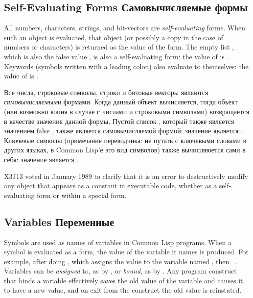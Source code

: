 \subsection{Self-Evaluating Forms Самовычисляемые формы}

All numbers, characters, strings, and bit-vectors
are \textit{self-evaluating} forms.
When such an object is evaluated, that object
(or possibly a copy in the case of numbers or characters)
is returned as the value
of the form.  The empty list {\emptylist}, which is also the false value {\false},
is also a self-evaluating form: the value of {\false} is {\false}.
Keywords (symbols written with a leading colon) also evaluate
to themselves: the value of  is .

Все числа, строковые символы, строки и битовые векторы являются
\textit{самовычисляемыми} формами.
Когда данный объект вычисляется, тогда объект (или возможно копия в случае с
числами и строковыми символами) возвращается в качестве значения данной
формы. Пустой список {\emptylist}, который также является значением false
{\false}, также является самовычисляемой формой: значение {\false} является
{\false}. 
Ключевые символы (примечание переводчика: не путать с ключевыми словами в других
языках, в Common Lisp'е это вид символов) также вычисляюется сами в себя:
значение  является .

\begin{newer}
X3J13 voted in January 1989  to clarify that
it is an error to destructively modify any object that appears as a constant
in executable code, whether as
a self-evaluating form or within a  special form.
\end{newer}

\subsection{Variables Переменные}

Symbols are used as names of variables in Common Lisp programs.
When a symbol is evaluated as a form, the value of the variable it names
is produced.  For example, after doing , which assigns
the value  to the variable named , then  \EV\ .
Variables can be \textit{assigned} to, as by , or \textit{bound},
as by .
Any program construct that binds a variable effectively saves the old
value of the variable and causes it to have a new value, and on exit from
the construct the old value is reinstated.

